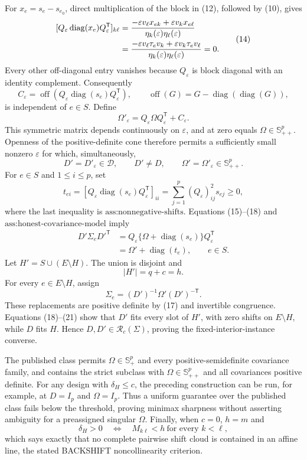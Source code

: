 For \(x_e=s_e-s_{e_0}\), direct multiplication of the block in (12), followed by (10), gives
\[
 \begin{aligned}
 \relax[Q_\varepsilon\operatorname{diag}(x_e)Q_\varepsilon^{\mathsf T}]_{k\ell}
 &=\frac{-\varepsilon v_\ell x_{ek}+\varepsilon v_kx_{e\ell}}
 {\eta_k(\varepsilon)\eta_\ell(\varepsilon)}\\
 &=\frac{-\varepsilon v_\ell\tau_ev_k+\varepsilon v_k\tau_ev_\ell}
 {\eta_k(\varepsilon)\eta_\ell(\varepsilon)}=0.
 \end{aligned} \tag{14}
\]
Every other off-diagonal entry vanishes because \(Q_\varepsilon\) is block diagonal with an identity complement.  Consequently
\[
 C_\varepsilon
 =\operatorname{off}\!\left(Q_\varepsilon\operatorname{diag}(s_e)Q_\varepsilon^{\mathsf T}\right),
 \qquad \operatorname{off}(G)=G-\operatorname{diag}(\operatorname{diag}(G)), \tag{15}
\]
is independent of \(e\in S\).  Define
\[
 \Omega'_\varepsilon=Q_\varepsilon\Omega Q_\varepsilon^{\mathsf T}+C_\varepsilon. \tag{16}
\]
This symmetric matrix depends continuously on \(\varepsilon\), and at zero equals \(\Omega\in\mathbb S_{++}^p\).  Openness of the positive-definite cone therefore permits a sufficiently small nonzero \(\varepsilon\) for which, simultaneously,
\[
 D'=D'_\varepsilon\in\mathcal D,\qquad D'\ne D,\qquad
 \Omega'=\Omega'_\varepsilon\in\mathbb S_{++}^p. \tag{17}
\]
For \(e\in S\) and \(1\le i\le p\), set
\[
 t_{ei}
 =[Q_\varepsilon\operatorname{diag}(s_e)Q_\varepsilon^{\mathsf T}]_{ii}
 =\sum_{j=1}^p(Q_\varepsilon)_{ij}^2s_{ej}\ge0, \tag{18}
\]
where the last inequality is \(\text{ass:nonnegative-shifts}\).  Equations (15)--(18) and \(\text{ass:honest-covariance-model}\) imply
\[
 \begin{aligned}
 D'\Sigma_eD'^{\mathsf T}
 &=Q_\varepsilon\{\Omega+\operatorname{diag}(s_e)\}Q_\varepsilon^{\mathsf T}\\
 &=\Omega'+\operatorname{diag}(t_e),
 \qquad e\in S.
 \end{aligned} \tag{19}
\]
Let \(H'=S\cup(E\setminus H)\).  The union is disjoint and
\[
 |H'|=q+c=h. \tag{20}
\]
For every \(e\in E\setminus H\), assign
\[
 \Sigma_e=(D')^{-1}\Omega'(D')^{-\mathsf T}. \tag{21}
\]
These replacements are positive definite by (17) and invertible congruence.  Equations (18)--(21) show that \(D'\) fits every slot of \(H'\), with zero shifts on \(E\setminus H\), while \(D\) fits \(H\).  Hence \(D,D'\in\mathcal R_c(\Sigma)\), proving the fixed-interior-instance converse.

The published class permits \(\Omega\in\mathbb S_+^p\) and every positive-semidefinite covariance family, and contains the strict subclass with \(\Omega\in\mathbb S_{++}^p\) and all covariances positive definite.  For any design with \(\delta_H\le c\), the preceding construction can be run, for example, at \(D=I_p\) and \(\Omega=I_p\).  Thus a uniform guarantee over the published class fails below the threshold, proving minimax sharpness without asserting ambiguity for a preassigned singular \(\Omega\).  Finally, when \(c=0\), \(h=m\) and
\[
 \delta_H>0
 \quad\Longleftrightarrow\quad
 M_{k\ell}<h\ \text{for every }k<\ell,
\]
which says exactly that no complete pairwise shift cloud is contained in an affine line, the stated BACKSHIFT noncollinearity criterion.